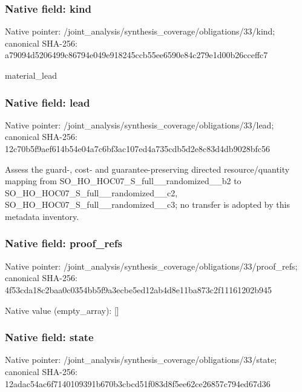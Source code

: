 \documentclass[10pt,a4paper]{article}
\begin{document}
\subsubsection{Native field: kind}
Native pointer: /joint\_\allowbreak{}analysis/synthesis\_\allowbreak{}coverage/obligations/33/kind; canonical SHA-256: a79094d5206499c86794e049e918245ccb55ee6590e84c279e1d00b26cceffc7

\begingroup\raggedright\sloppy material\_\allowbreak{}lead\par\endgroup

\subsubsection{Native field: lead}
Native pointer: /joint\_\allowbreak{}analysis/synthesis\_\allowbreak{}coverage/obligations/33/lead; canonical SHA-256: 12c70b5f9aef614b54e04a7c6bf3ac107ed4a735cdb5d2e8c83d4db9028bfc56

\begingroup\raggedright\sloppy Assess the guard-,\allowbreak{} cost- and guarantee-preserving directed resource/\allowbreak{}quantity mapping from SO\_\allowbreak{}HO\_\allowbreak{}HOC07\_\allowbreak{}S\_\allowbreak{}full\_\allowbreak{}\_\allowbreak{}randomized\_\allowbreak{}\_\allowbreak{}b2 to SO\_\allowbreak{}HO\_\allowbreak{}HOC07\_\allowbreak{}S\_\allowbreak{}full\_\allowbreak{}\_\allowbreak{}randomized\_\allowbreak{}\_\allowbreak{}c2,\allowbreak{} SO\_\allowbreak{}HO\_\allowbreak{}HOC07\_\allowbreak{}S\_\allowbreak{}full\_\allowbreak{}\_\allowbreak{}randomized\_\allowbreak{}\_\allowbreak{}c3;\allowbreak{} no transfer is adopted by this metadata inventory.\par\endgroup

\subsubsection{Native field: proof\_\allowbreak{}refs}
Native pointer: /joint\_\allowbreak{}analysis/synthesis\_\allowbreak{}coverage/obligations/33/proof\_\allowbreak{}refs; canonical SHA-256: 4f53cda18c2baa0c0354bb5f9a3ecbe5ed12ab4d8e11ba873c2f11161202b945

Native value (empty\_\allowbreak{}array): []

\subsubsection{Native field: state}
Native pointer: /joint\_\allowbreak{}analysis/synthesis\_\allowbreak{}coverage/obligations/33/state; canonical SHA-256: 12adac54ac6f7140109391b670b3cbcd51f083d8f5ee62ce26857c794ed67d36
\end{document}
